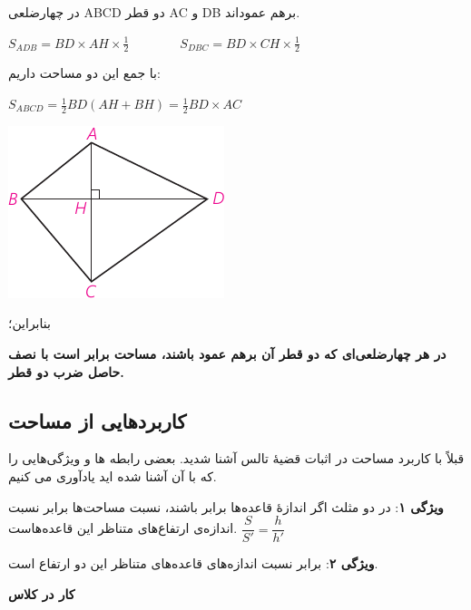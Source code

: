 \documentclass[12pt, a4paper]{book}
\begin{document}
\begin{minipage}{0.65\textwidth}
	در چهارضلعی ABCD دو قطر AC و DB برهم عموداند.
	\begin{flushleft}
		$ S_{ADB} = BD \times AH \times \frac12 \qquad \qquad S_{DBC} = BD \times CH \times \frac12 $
	\end{flushleft}
	با جمع این دو مساحت داریم:
	\begin{flushleft}
		$S_{ABCD} = \frac12 BD (AH + BH) = \frac12 BD \times AC$
	\end{flushleft}
\end{minipage}
\begin{minipage}{0.3\textwidth}
	\begin{flushleft}
		\includegraphics{"Shapes/Fasl - 3/Dars 2/P65-S4"}
	\end{flushleft}
\end{minipage}

بنابراین؛

\textbf{در هر چهارضلعی‌ای که دو قطر آن برهم عمود باشند، مساحت برابر است با نصف حاصل ضرب دو قطر. }

\subsection{کاربردهایی از مساحت}
قبلاً با کاربرد مساحت در اثبات قضیهٔ تالس آشنا شدید. بعضی رابطه ها و ویژگی‌هایی را که با آن آشنا شده اید یادآوری می کنیم.
\bigskip

\textbf{ویژگی ۱}:
در دو مثلث اگر اندازۀ قاعده‌ها برابر باشند، نسبت مساحت‌ها برابر نسبت اندازه‌ی ارتفاع‌های متناظر این قاعده‌هاست.
$
	\dfrac{S}{S'} = \dfrac{h}{h'}
$
 \bigskip

\textbf{ویژگی ۲}:
 برابر نسبت اندازه‌های قاعده‌های متناظر این دو ارتفاع است.
 \bigskip
 
 \textbf{کار در کلاس}
 
\end{document}
